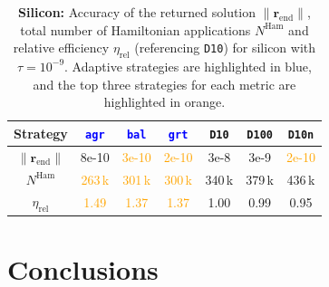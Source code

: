 \documentclass[hidelinks,onefignum,onetabnum]{siamart250211}
\newcommand{\Nham}{N^{\mathrm{Ham}}}
\newcommand{\releta}{\eta_{\mathrm{rel}}}
\newcommand{\rend}{\bm r_\text{end}}
\newcommand{\sbal}{\texttt{bal}\xspace}
\newcommand{\sagr}{\texttt{agr}\xspace}
\newcommand{\sgrt}{\texttt{grt}\xspace}
\newcommand{\sdten}{\texttt{D10}\xspace}
\newcommand{\sdhun}{\texttt{D100}\xspace}
\newcommand{\sdnorm}{\texttt{D10n}\xspace}
\begin{document}
%
\begin{table}
  \centering
  \smaller
  \begin{tabular}{c|cccccc}
    \toprule
    Strategy         & \textcolor{blue}{\sagr}    & \textcolor{blue}{\sbal}    & \textcolor{blue}{\sgrt}    & \sdten    & \sdhun    & \sdnorm \\
    \midrule
    $\|\rend\|$     & 8e-10       & \textcolor{orange}{3e-10}  & \textcolor{orange}{2e-10}  & 3e-8        & 3e-9        & \textcolor{orange}{2e-10}  \\
    $\Nham$      & \textcolor{orange}{263\,k} & \textcolor{orange}{301\,k} & \textcolor{orange}{300\,k} & 340\,k      & 379\,k      & 436\,k      \\
    $\releta$ & \textcolor{orange}{1.49}             & \textcolor{orange}{1.37}             & \textcolor{orange}{1.37}             & 1.00                  & 0.99                  & 0.95                  \\
    \bottomrule
  \end{tabular}
  \caption{\textbf{Silicon:} Accuracy of the returned solution $\|\rend\|$,
  total number of Hamiltonian applications $\Nham$ and relative efficiency
  $\releta$ (referencing \sdten) for silicon with $\tau=10^{-9}$.
  Adaptive strategies are highlighted in blue, and the top three
  strategies for each metric are highlighted in orange.}
  \label{tab:summary_silicon_20_-9}
\end{table}

%
%
%
\section{Conclusions}
\label{sec:conclusions}
\end{document}
